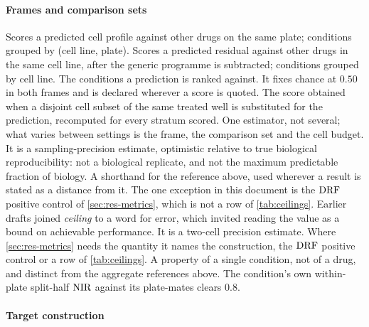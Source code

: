 \paragraph{Frames and comparison sets}

\begin{description}[leftmargin=1em, itemsep=0.5ex,
                    font=\normalfont\bfseries]
 Scores a predicted cell profile against
  other drugs on the same plate; conditions grouped by (cell line, plate).
 Scores a predicted residual against other
  drugs in the same cell line, after the generic programme is subtracted;
  conditions grouped by cell line.
 The conditions a prediction is ranked
  against. It fixes chance at $0.50$ in both frames and is declared wherever a
  score is quoted.
 The score
  obtained when a disjoint cell subset of the same treated well is substituted
  for the prediction, recomputed for every stratum scored. One estimator, not
  several; what varies between settings is the frame, the comparison set and the
  cell budget. It is a sampling-precision estimate, optimistic relative to true
  biological reproducibility: not a biological replicate, and not the maximum
  predictable fraction of biology.
 A shorthand for the reference above, used wherever a
  result is stated as a distance from it. The one exception in this document is
  the $\textrm{DRF}$ positive control of \cref{sec:res-metrics}, which is not a row of
  \cref{tab:ceilings}.
 Earlier drafts joined
  \emph{ceiling} to a word for error, which invited reading the value as a
  bound on achievable performance. It is a two-cell precision estimate. Where
  \cref{sec:res-metrics} needs the quantity it names the construction, the
  $\textrm{DRF}$ positive control or a row of \cref{tab:ceilings}.
 A property of a single condition, not
  of a drug, and distinct from the aggregate references above. The
  condition's own within-plate split-half $\textrm{NIR}$ against its plate-mates clears
  $0.8$.
\end{description}

\paragraph{Target construction}

